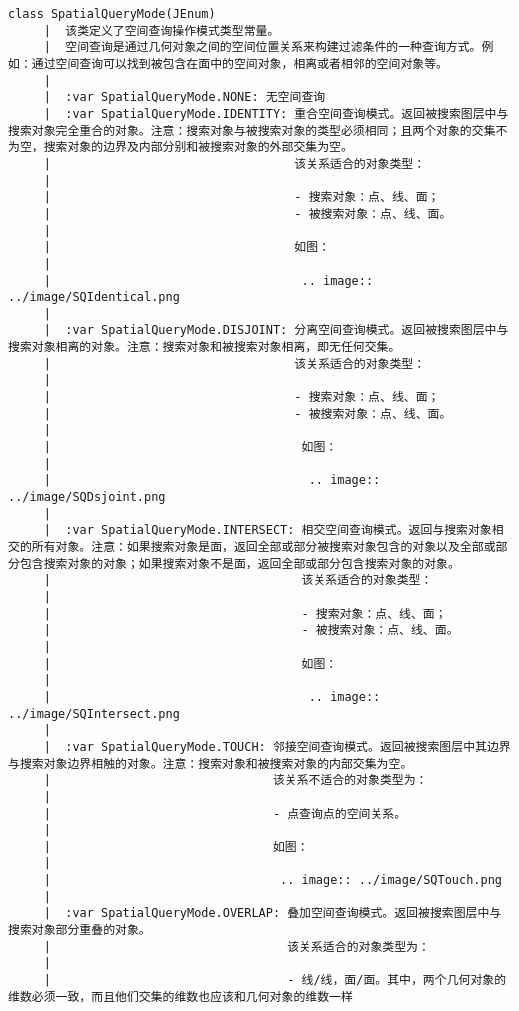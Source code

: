 \documentclass[11pt]{article}
\begin{document}
\begin{Verbatim}[commandchars=\\\{\}]
    class SpatialQueryMode(JEnum)
     |  该类定义了空间查询操作模式类型常量。
     |  空间查询是通过几何对象之间的空间位置关系来构建过滤条件的一种查询方式。例如：通过空间查询可以找到被包含在面中的空间对象，相离或者相邻的空间对象等。
     |  
     |  :var SpatialQueryMode.NONE: 无空间查询
     |  :var SpatialQueryMode.IDENTITY: 重合空间查询模式。返回被搜索图层中与搜索对象完全重合的对象。注意：搜索对象与被搜索对象的类型必须相同；且两个对象的交集不为空，搜索对象的边界及内部分别和被搜索对象的外部交集为空。
     |                                  该关系适合的对象类型：
     |  
     |                                  - 搜索对象：点、线、面；
     |                                  - 被搜索对象：点、线、面。
     |  
     |                                  如图：
     |  
     |                                   .. image:: ../image/SQIdentical.png
     |  
     |  :var SpatialQueryMode.DISJOINT: 分离空间查询模式。返回被搜索图层中与搜索对象相离的对象。注意：搜索对象和被搜索对象相离，即无任何交集。
     |                                  该关系适合的对象类型：
     |  
     |                                  - 搜索对象：点、线、面；
     |                                  - 被搜索对象：点、线、面。
     |  
     |                                   如图：
     |  
     |                                    .. image:: ../image/SQDsjoint.png
     |  
     |  :var SpatialQueryMode.INTERSECT: 相交空间查询模式。返回与搜索对象相交的所有对象。注意：如果搜索对象是面，返回全部或部分被搜索对象包含的对象以及全部或部分包含搜索对象的对象；如果搜索对象不是面，返回全部或部分包含搜索对象的对象。
     |                                   该关系适合的对象类型：
     |  
     |                                   - 搜索对象：点、线、面；
     |                                   - 被搜索对象：点、线、面。
     |  
     |                                   如图：
     |  
     |                                    .. image:: ../image/SQIntersect.png
     |  
     |  :var SpatialQueryMode.TOUCH: 邻接空间查询模式。返回被搜索图层中其边界与搜索对象边界相触的对象。注意：搜索对象和被搜索对象的内部交集为空。
     |                               该关系不适合的对象类型为：
     |  
     |                               - 点查询点的空间关系。
     |  
     |                               如图：
     |  
     |                                .. image:: ../image/SQTouch.png
     |  
     |  :var SpatialQueryMode.OVERLAP: 叠加空间查询模式。返回被搜索图层中与搜索对象部分重叠的对象。
     |                                 该关系适合的对象类型为：
     |  
     |                                 - 线/线，面/面。其中，两个几何对象的维数必须一致，而且他们交集的维数也应该和几何对象的维数一样

\end{Verbatim}
\end{document}
